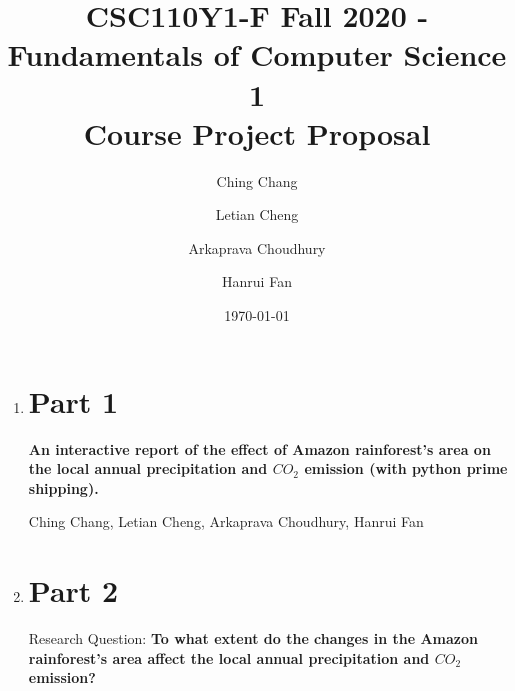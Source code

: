 \documentclass[12pt]{article}
\title{CSC110Y1-F Fall 2020 - Fundamentals of Computer Science 1 \\ Course Project Proposal}
\author{
  Ching Chang\\
  \and
  Letian Cheng\\
  \and
  Arkaprava Choudhury\\
  \and
  Hanrui Fan
}
\date{\today}
\begin{document}
\maketitle

\newpage


\begin{enumerate}
\item \section*{Part 1}
\textbf{An interactive report of the effect of Amazon rainforest's area on the local annual precipitation and $CO_2$ emission (with python prime shipping).}

Ching Chang, Letian Cheng, Arkaprava Choudhury, Hanrui Fan
\newpage

\item \section*{Part 2}

\begin{text}
Research Question: \textbf{To what extent do the changes in the Amazon rainforest’s area affect the local annual precipitation and $CO_2$ emission?}


\end{text}
\end{enumerate}
\end{document}
